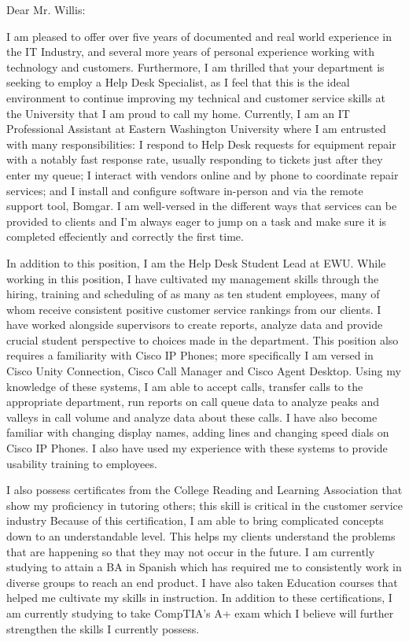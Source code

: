 \documentclass[a4paper,10pt]{article}
\begin{document}
Dear Mr. Willis:\\

\par
I am pleased to offer over five years of documented and real world experience in the IT Industry, and several more years of personal experience working with technology and customers. Furthermore, I am thrilled that your department is seeking to employ a Help Desk Specialist, as I feel that this is the ideal environment to continue improving my technical and customer service skills at the University that I am proud to call my home. Currently, I am an IT Professional Assistant at Eastern Washington University where I am entrusted with many responsibilities: I respond to Help Desk requests for equipment repair with a notably fast response rate, usually responding to tickets just after they enter my queue; I interact with vendors online and by phone to coordinate repair services; and I install and configure software in-person and via the remote support tool, Bomgar. I am well-versed in the different ways that services can be provided to clients and I'm always eager to jump on a task and make sure it is completed effeciently and correctly the first time.
\par
In addition to this position, I am the Help Desk Student Lead at EWU. While working in this position, I have cultivated my management skills through the hiring, training and scheduling of as many as ten student employees, many of whom receive consistent positive customer service rankings from our clients. I have worked alongside supervisors to create reports, analyze data and provide crucial student perspective to choices made in the department. This position also requires a familiarity with Cisco IP Phones; more specifically I am versed in Cisco Unity Connection, Cisco Call Manager and Cisco Agent Desktop. Using my knowledge of these systems, I am able to accept calls, transfer calls to the appropriate department, run reports on call queue data to analyze peaks and valleys in call volume and analyze data about these calls. I have also become familiar with changing display names, adding lines and changing speed dials on Cisco IP Phones. I also have used my experience with these systems to provide usability training to employees.
\par
I also possess certificates from the College Reading and Learning Association that show my proficiency in tutoring others; this skill is critical in the customer service industry Because of this certification, I am able to bring complicated concepts down to an understandable level. This helps my clients understand the problems that are happening so that they may not occur in the future. I am currently studying to attain a BA in Spanish which has required me to consistently work in diverse groups to reach an end product. I have also taken Education courses that helped me cultivate my skills in instruction. In addition to these certifications, I am currently studying to take CompTIA's A+ exam which I believe will further strengthen the skills I currently possess.\\
\end{document}
